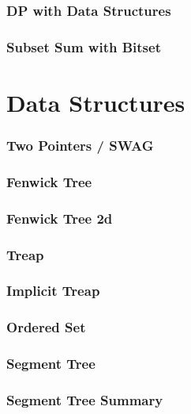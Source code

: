 \documentclass[12pt, a4paper]{report}
\let\oldsection\section
\renewcommand{\section}{\clearpage\oldsection}
\begin{document}
\section{DP with Data Structures}


\section{Subset Sum with Bitset}


\part{Data Structures}
\setcounter{section}{0}

\section{Two Pointers / SWAG}


\section{Fenwick Tree}


\section{Fenwick Tree 2d}

\section{Treap}

\section{Implicit Treap}

\section{Ordered Set}

\section{Segment Tree}

\section{Segment Tree Summary}

\end{document}
